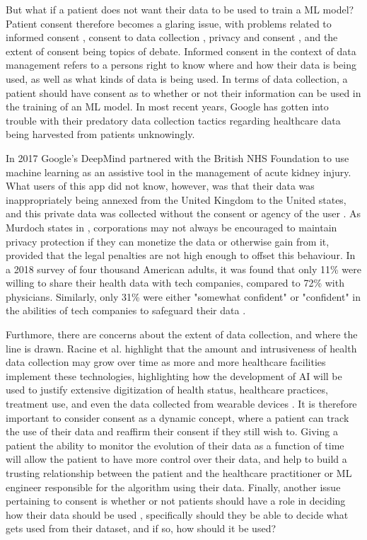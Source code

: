 \documentclass[a4paper]{article}
\begin{document}
But what if a patient does not want their data to be used to train a ML model? Patient consent therefore becomes a glaring issue, with problems related to informed consent \cite{Gerke_2020,Guan_2019}, consent to data collection \cite{Gerke_2020,Ali_2023,Murdoch_2021}, privacy and consent \cite{Murdoch_2021}, and the extent of consent \cite{Racine_2019,price_privacy_2019} being topics of debate. Informed consent in the context of data management refers to a persons right to know where and how their data is being used, as well as what kinds of data is being used. In terms of data collection, a patient should have consent as to whether or not their information can be used in the training of an ML model. In most recent years, Google has gotten into trouble with their predatory data collection tactics regarding healthcare data being harvested from patients unknowingly.

In 2017 Google's DeepMind partnered with the British NHS Foundation to use machine learning as an assistive tool in the management of acute kidney injury. What users of this app did not know, however, was that their data was inappropriately being annexed from the United Kingdom to the United states, and this private data was collected without the consent or agency of the user \cite{Gerke_2020,Murdoch_2021}. As Murdoch states in \cite{Murdoch_2021}, corporations may not always be encouraged to maintain privacy protection if they can monetize the data or otherwise gain from it, provided that the legal penalties are not high enough to offset this behaviour. In a 2018 survey of four thousand American adults, it was found that only 11\% were willing to share their health data with tech companies, compared to 72\% with physicians. Similarly, only 31\% were either "somewhat confident" or "confident" in the abilities of tech companies to safeguard their data \cite{Murdoch_2021}.

Furthmore, there are concerns about the extent of data collection, and where the line is drawn. Racine et al. highlight that the amount and intrusiveness of health data collection may grow over time as more and more healthcare facilities implement these technologies, highlighting how the development of AI will be used to justify extensive digitization of health status, healthcare practices, treatment use, and even the data collected from wearable devices \cite{Racine_2019}. It is therefore important to consider consent as a dynamic concept, where a patient can track the use of their data and reaffirm their consent if they still wish to. Giving a patient the ability to monitor the evolution of their data as a function of time will allow the patient to have more control over their data, and help to build a trusting relationship between the patient and the healthcare practitioner or ML engineer responsible for the algorithm using their data. Finally, another issue pertaining to consent is whether or not patients should have a role in deciding how their data should be used \cite{price_privacy_2019}, specifically should they be able to decide what gets used from their dataset, and if so, how should it be used?
\end{document}
